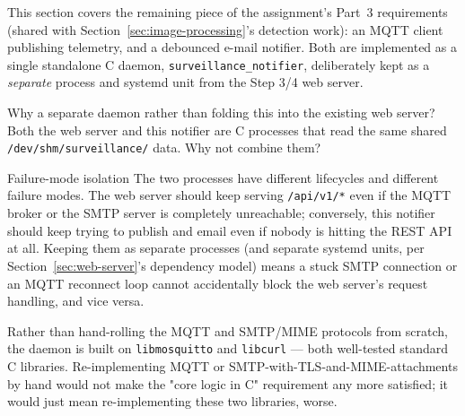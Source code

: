 \label{sec:mqtt-email}


This section covers the remaining piece of the assignment's Part~3
requirements (shared with Section~\ref{sec:image-processing}'s detection
work): an MQTT client publishing telemetry, and a debounced e-mail
notifier. Both are implemented as a single standalone C daemon,
\texttt{surveillance\_notifier}, deliberately kept as a \emph{separate}
process and systemd unit from the Step 3/4 web server.

\begin{questionsection}{Why a separate daemon rather than folding this into the existing web server?}
Both the web server and this notifier are C processes that read the same
shared \texttt{/dev/shm/surveillance/} data. Why not combine them?
\end{questionsection}

\begin{answersection}{Failure-mode isolation}
The two processes have different lifecycles and different failure modes.
The web server should keep serving \texttt{/api/v1/*} even if the MQTT
broker or the SMTP server is completely unreachable; conversely, this
notifier should keep trying to publish and email even if nobody is
hitting the REST API at all. Keeping them as separate processes (and
separate systemd units, per Section~\ref{sec:web-server}'s dependency
model) means a stuck SMTP connection or an MQTT reconnect loop cannot
accidentally block the web server's request handling, and vice versa.
\end{answersection}

Rather than hand-rolling the MQTT and SMTP/MIME protocols from scratch,
the daemon is built on \texttt{libmosquitto} and \texttt{libcurl} ---
both well-tested standard C libraries. Re-implementing MQTT or
SMTP-with-TLS-and-MIME-attachments by hand would not make the "core
logic in C" requirement any more satisfied; it would just mean
re-implementing these two libraries, worse.


\begin{table}[H]
\centering
\caption{MQTT topics published by \texttt{surveillance\_notifier}.}
\label{tab:mqtt-topics}
\end{table}

